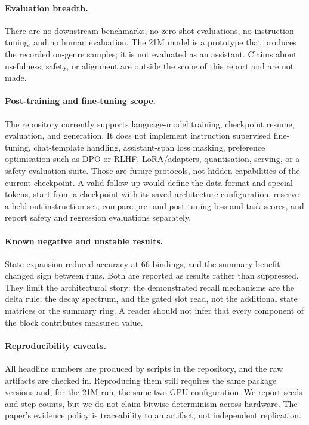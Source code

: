\paragraph{Evaluation breadth.}
There are no downstream benchmarks, no zero-shot evaluations, no instruction tuning, and no
human evaluation. The 21M model is a prototype that produces the recorded on-genre samples; it
is not evaluated as an assistant. Claims about usefulness, safety, or alignment are outside the
scope of this report and are not made.

\paragraph{Post-training and fine-tuning scope.}
The repository currently supports language-model training, checkpoint resume, evaluation, and
generation. It does not implement instruction supervised fine-tuning, chat-template handling,
assistant-span loss masking, preference optimisation such as DPO or RLHF, LoRA/adapters,
quantisation, serving, or a safety-evaluation suite. Those are future protocols, not hidden
capabilities of the current checkpoint. A valid follow-up would define the data format and
special tokens, start from a checkpoint with its saved architecture configuration, reserve a
held-out instruction set, compare pre- and post-tuning loss and task scores, and report safety
and regression evaluations separately.

\paragraph{Known negative and unstable results.}
State expansion reduced accuracy at 66 bindings, and the summary benefit changed sign between
runs. Both are reported as results rather than suppressed. They limit the architectural story:
the demonstrated recall mechanisms are the delta rule, the decay spectrum, and the gated slot
read, not the additional state matrices or the summary ring. A reader should not infer that
every component of the block contributes measured value.

\paragraph{Reproducibility caveats.}
All headline numbers are produced by scripts in the repository, and the raw artifacts are
checked in. Reproducing them still requires the same package versions and, for the 21M run, the
same two-GPU configuration. We report seeds and step counts, but we do not claim bitwise
determinism across hardware. The paper's evidence policy is traceability to an artifact, not
independent replication.
